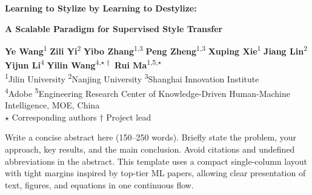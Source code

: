 \documentclass[10pt,a4paper]{article}
\begin{document}
\thispagestyle{fancy}

\begin{center}
  {\fontsize{20}{24}\selectfont\rmfamily\bfseries\color{black}%
    Learning to Stylize by Learning to Destylize:\par}
  \vspace{1pt}
  {\fontsize{16}{20}\selectfont\rmfamily\bfseries\color{black}%
    A Scalable Paradigm for Supervised Style Transfer\par}
  \vspace{6pt}

  {\normalsize\rmfamily
    \textbf{Ye Wang}\textsuperscript{1}\quad
    \textbf{Zili Yi}\textsuperscript{2}\quad
    \textbf{Yibo Zhang}\textsuperscript{1,3}\quad
    \textbf{Peng Zheng}\textsuperscript{1,3}\quad
    \textbf{Xuping Xie}\textsuperscript{1}\quad
    \textbf{Jiang Lin}\textsuperscript{2}\\[2pt]
    \textbf{Yijun Li}\textsuperscript{4}\quad
    \textbf{Yilin Wang}\textsuperscript{4,$\star\dagger$}\quad
    \textbf{Rui Ma}\textsuperscript{1,5,$\star$}}\\[4pt]
  {\footnotesize\rmfamily\color{black}
    \textsuperscript{1}Jilin University\quad
    \textsuperscript{2}Nanjing University\quad
    \textsuperscript{3}Shanghai Innovation Institute\\[1pt]
    \textsuperscript{4}Adobe\quad
    \textsuperscript{5}Engineering Research Center of Knowledge-Driven Human-Machine Intelligence, MOE, China}\\[2pt]
  {\footnotesize\rmfamily\color{jluGray}
    $\star$ Corresponding authors \quad\quad $\dagger$ Project lead}
\end{center}

\vspace{-1em}
\noindent{\color{jluDeepBlue}\rule{\textwidth}{0.7pt}}
\vspace{-1em}

\begin{center}
\begin{tcolorbox}[
  enhanced,
  width=0.92\textwidth,
  colback=jluDeepBlue!6!white,
  colframe=jluDeepBlue!35!white,
  boxrule=0.6pt,
  arc=3pt,
  left=6pt,right=6pt,top=5pt,bottom=5pt
]
  {\small
  Write a concise abstract here (150--250 words). Briefly state the
  problem, your approach, key results, and the main conclusion. Avoid
  citations and undefined abbreviations in the abstract. This template
  uses a compact single-column layout with tight margins inspired by
  top-tier ML papers, allowing clear presentation of text, figures,
  and equations in one continuous flow.}
\end{tcolorbox}
\end{center}
\end{document}
